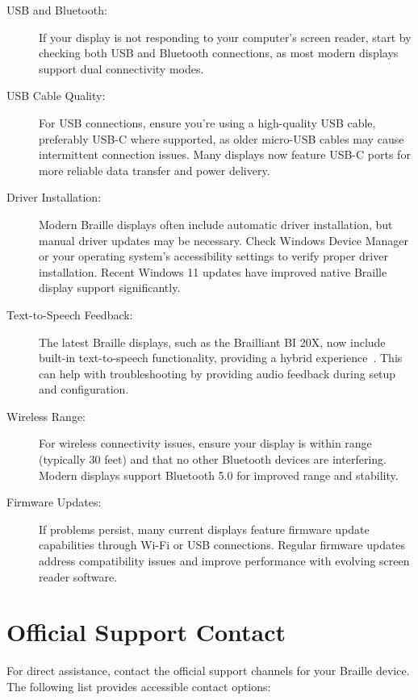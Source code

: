 \begin{description}
    \item[USB and Bluetooth:] If your display is not responding to your computer's screen reader, start by checking both USB and Bluetooth connections, as most modern displays support dual connectivity modes.
    \item[USB Cable Quality:] For USB connections, ensure you're using a high-quality USB cable, preferably USB-C where supported, as older micro-USB cables may cause intermittent connection issues. Many displays now feature USB-C ports for more reliable data transfer and power delivery.
    \item[Driver Installation:] Modern Braille displays often include automatic driver installation, but manual driver updates may be necessary. Check Windows Device Manager or your operating system's accessibility settings to verify proper driver installation. Recent Windows 11 updates have improved native Braille display support significantly.
    \item[Text-to-Speech Feedback:] The latest Braille displays, such as the Brailliant BI 20X, now include built-in text-to-speech functionality, providing a hybrid experience~\cite{BrailliantBI20X}. This can help with troubleshooting by providing audio feedback during setup and configuration.
    \item[Wireless Range:] For wireless connectivity issues, ensure your display is within range (typically 30 feet) and that no other Bluetooth devices are interfering. Modern displays support Bluetooth 5.0 for improved range and stability.
    \item[Firmware Updates:] If problems persist, many current displays feature firmware update capabilities through Wi-Fi or USB connections. Regular firmware updates address compatibility issues and improve performance with evolving screen reader software.
\end{description}

\section{Official Support Contact}
\label{report2}
For direct assistance, contact the official support channels for your Braille device. The following list provides accessible contact options:

